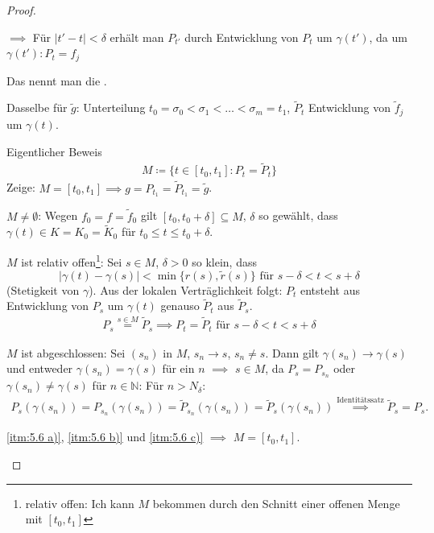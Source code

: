 \documentclass[a4paper,10pt]{scrbook}
\begin{document}
\begin{theorem}[Satz]
\begin{proof}
\begin{enum-arab}
      $\implies$ Für $|t'-t| < \delta$ erhält man $P_{t'}$ durch Entwicklung von $P_t$ um $\gamma(t')$, da um $\gamma(t') : P_t = f_j$

      Das nennt man die .

      Dasselbe für $\widetilde{g}$: Unterteilung $t_0 = \sigma_0 < \sigma_1 < \ldots < \sigma_m = t_1$, $\widetilde{P}_t$ Entwicklung von $\widetilde{f}_j$ um $\gamma(t)$.

      \item Eigentlicher Beweis
      \begin{align*}
        M \coloneq \{t \in [t_0,t_1] : P_t = \widetilde{P}_t \}
      \end{align*}
      Zeige: $M = [t_0,t_1] \implies g = P_{t_1} = \widetilde{P}_{t_1} = \widetilde{g}$.
      \begin{enum-arab}
        \item \label{itm:5.6 a)} $M \neq \emptyset$: Wegen $f_0 = f = \widetilde{f}_0$ gilt $[t_0,t_0 + \delta] \subseteq M$, $\delta$ so gewählt, dass $\gamma(t) \in K = K_0 = \widetilde{K}_0$ für $t_0 \leq t \leq t_0 + \delta$.

        \item \label{itm:5.6 b)} $M$ ist relativ offen\footnote{relativ offen: Ich kann $M$ bekommen durch den Schnitt einer offenen Menge mit $[t_0,t_1]$}: Sei $s \in M$, $\delta > 0$ so klein, dass \[|\gamma(t) - \gamma(s)| < \min\{r(s),\widetilde{r}(s)\} \text{ für } s - \delta < t < s + \delta\] (Stetigkeit von $\gamma$). Aus der lokalen Verträglichkeit folgt: $P_t$ entsteht aus Entwicklung von $P_s$ um $\gamma(t)$ genauso $\widetilde{P}_t$ aus $\widetilde{P}_s$.
        \begin{align*}
          P_s \overset{s \in M}{=} \widetilde{P}_s \implies P_t = \widetilde{P}_t \text{ für } s - \delta < t < s + \delta
        \end{align*}

        \item \label{itm:5.6 c)} $M$ ist abgeschlossen: Sei $(s_n)$ in $M$, $s_n \to s$, $s_n \neq s$. Dann gilt $\gamma(s_n) \to \gamma(s)$ und entweder $\gamma(s_n) = \gamma(s)$ für ein $n$ $\implies$ $s \in M$, da $P_s = P_{s_n}$ oder $\gamma(s_n) \neq \gamma(s)$ für $n \in \mathbb{N}$: Für $n > N_\delta$:
        \begin{align*}
          P_s(\gamma(s_n)) = P_{s_n}(\gamma(s_n)) = \widetilde{P}_{s_n}(\gamma(s_n)) = \widetilde{P}_s(\gamma(s_n))
          \overset{\text{Identitätssatz}}{\implies} \widetilde{P}_s = P_s .
        \end{align*}
      \end{enum-arab}
      \ref{itm:5.6 a)}, \ref{itm:5.6 b)} und \ref{itm:5.6 c)} $\implies$ $M = [t_0,t_1]$.
    \end{enum-arab}
  \end{proof}
\end{theorem}
\end{document}
